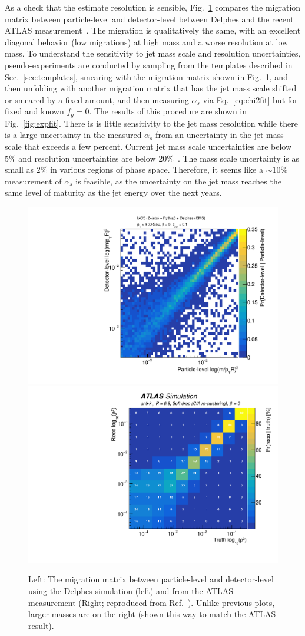 As a check that the estimate resolution is sensible, Fig.~\ref{fig:expres} compares the migration matrix between particle-level and detector-level between Delphes and the recent ATLAS measurement~\cite{Aaboud:2017qwh}.  The migration is qualitatively the same, with an excellent diagonal behavior (low migrations) at high mass and a worse resolution at low mass.  To understand the sensitivity to jet mass scale and resolution uncertainties, pseudo-experiments are conducted by sampling from the templates described in Sec.~\ref{sec:templates}, smearing with the migration matrix shown in Fig.~\ref{fig:expres}, and then unfolding with another migration matrix that has the jet mass scale shifted or smeared by a fixed amount, and then measuring $\alpha_s$ via Eq.~\ref{eq:chi2fit} but for fixed and known $f_g=0$.  The results of this procedure are shown in Fig.~\ref{fig:expfit}.  There is is little sensitivity to the jet mass resolution while there is a large uncertainty in the measured $\alpha_s$ from an uncertainty in the jet mass scale that exceeds a few percent.  Current jet mass scale uncertainties are below $5\%$ and resolution uncertainties are below 20\%~\cite{}.  The mass scale uncertainty is as small as $2\%$ in various regions of phase space.  Therefore, it seems like a $\sim 10\%$ measurement of $\alpha_s$ is feasible, as the uncertainty on the jet mass reaches the same level of maturity as the jet energy over the next years.

\begin{figure}[h!]
\begin{center}
\includegraphics[width = 0.49\columnwidth]{figures/SD_resolution.pdf}\includegraphics[width = 0.49\columnwidth]{figures/figaux_03a.pdf}
\end{center}
\caption{Left: The migration matrix between particle-level and detector-level using the Delphes simulation (left) and from the ATLAS measurement (Right; reproduced from Ref.~\cite{Aaboud:2017qwh}).  Unlike previous plots, larger masses are on the right (shown this way to match the ATLAS result).}
\label{fig:expres}
\end{figure}


